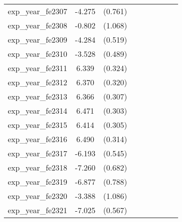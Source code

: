 {\begin{tabular}{l*{4}{cc}}
exp\_year\_fe2307&   -4.275\sym{***}&  (0.761)&                  &         &                  &         &                  &         \\
exp\_year\_fe2308&   -0.802         &  (1.068)&                  &         &                  &         &                  &         \\
exp\_year\_fe2309&   -4.284\sym{***}&  (0.519)&                  &         &                  &         &                  &         \\
exp\_year\_fe2310&   -3.528\sym{***}&  (0.489)&                  &         &                  &         &                  &         \\
exp\_year\_fe2311&    6.339\sym{***}&  (0.324)&                  &         &                  &         &                  &         \\
exp\_year\_fe2312&    6.370\sym{***}&  (0.320)&                  &         &                  &         &                  &         \\
exp\_year\_fe2313&    6.366\sym{***}&  (0.307)&                  &         &                  &         &                  &         \\
exp\_year\_fe2314&    6.471\sym{***}&  (0.303)&                  &         &                  &         &                  &         \\
exp\_year\_fe2315&    6.414\sym{***}&  (0.305)&                  &         &                  &         &                  &         \\
exp\_year\_fe2316&    6.490\sym{***}&  (0.314)&                  &         &                  &         &                  &         \\
exp\_year\_fe2317&   -6.193\sym{***}&  (0.545)&                  &         &                  &         &                  &         \\
exp\_year\_fe2318&   -7.260\sym{***}&  (0.682)&                  &         &                  &         &                  &         \\
exp\_year\_fe2319&   -6.877\sym{***}&  (0.788)&                  &         &                  &         &                  &         \\
exp\_year\_fe2320&   -3.388\sym{**} &  (1.086)&                  &         &                  &         &                  &         \\
exp\_year\_fe2321&   -7.025\sym{***}&  (0.567)&                  &         &                  &         &                  &         \\

\end{tabular}}
